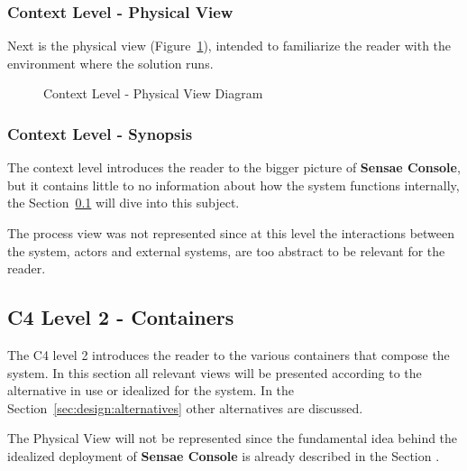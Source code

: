 \subsubsection{Context Level - Physical View}
\label{subsubsec:design:architecture:context:physical}

Next is the physical view (Figure~\ref{fig:design:architecture:context:physical:diagram}), intended to familiarize the reader with the environment where the solution runs.

\begin{figure}[H]
   \centering
   \resizebox{\columnwidth}{!}
   {
      
   }
   \caption[Context Level - Physical View Diagram]{Context Level - Physical View Diagram}
   \label{fig:design:architecture:context:physical:diagram}
\end{figure}

\subsubsection{Context Level - Synopsis}
\label{subsubsec:design:architecture:context:synopsis}

The context level introduces the reader to the bigger picture of \textbf{Sensae Console}, but it contains little to no information about how the system functions internally, the Section~\ref{subsec:design:architecture:containers} will dive into this subject.

The process view was not represented since at this level the interactions between the system, actors and external systems, are too abstract to be relevant for the reader.

\subsection{C4 Level 2 - Containers}
\label{subsec:design:architecture:containers}

The C4 level 2 introduces the reader to the various containers that compose the system. In this section all relevant views will be presented according to the alternative in use or idealized for the system. In the Section~\ref{sec:design:alternatives} other alternatives are discussed. 

The Physical View will not be represented since the fundamental idea behind the idealized deployment of \textbf{Sensae Console} is already described in the Section .

